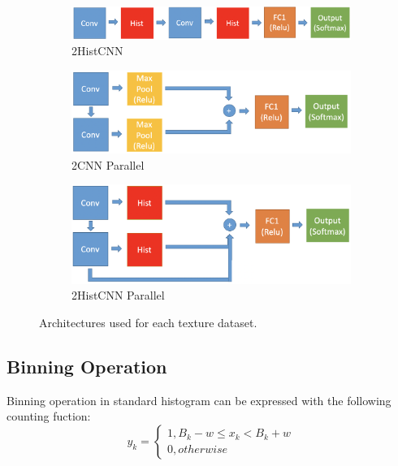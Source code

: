 \documentclass[10pt,twocolumn,letterpaper]{article}
\begin{document}
\begin{figure}[htb]
	\begin{subfigure}[b]{.30\textwidth}
		\centering
		\includegraphics[width=\textwidth]{2HistCNN.png}\vspace{.55cm}
		\caption{2HistCNN}
	\end{subfigure}
	\hfil
	\begin{subfigure}[b]{.30\textwidth}
		\centering
		\includegraphics[width=\textwidth]{2CNN_parallel.png}
		\caption{2CNN Parallel}
	\end{subfigure}
	\hfil
	\begin{subfigure}[b]{.30\textwidth}
		\centering
		\includegraphics[width=\textwidth]{2HistCNN_parallel.png}
		\caption{2HistCNN Parallel}
	\end{subfigure}
	\caption{Architectures used for each texture dataset.}
	\label{fig:Networks}
\end{figure}

\subsection{Binning Operation}

Binning operation in standard histogram can be expressed with the following counting fuction:
\begin{equation}
\label{eqn:cf}
y_k = \begin{cases}
1,B_k - w \leq x_k < B_k + w\\
0, otherwise
\end{cases}
\end{equation}
\end{document}
